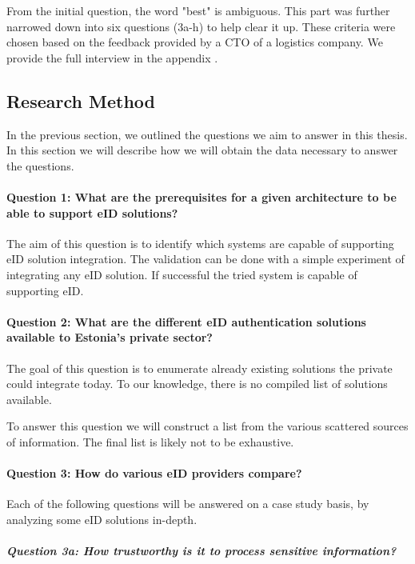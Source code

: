 From the initial question, the word "best" is ambiguous. This part was further narrowed down into six questions (3a-h) to help clear it up. These criteria were chosen based on the feedback provided by a CTO of a logistics company. We provide the full interview in the appendix .

\subsection{Research Method}

In the previous section, we outlined the questions we aim to answer in this thesis. In this section we will describe how we will obtain the data necessary to answer the questions.

\paragraph{Question 1: What are the prerequisites for a given architecture to be able to support eID solutions?}\noindent

The aim of this question is to identify which systems are capable of supporting eID solution integration. The validation can be done with a simple experiment of integrating any eID solution. If successful the tried system is capable of supporting eID.

\paragraph{Question 2: What are the different eID authentication solutions available to Estonia's private sector?}\noindent

The goal of this question is to enumerate already existing solutions the private could integrate today. To our knowledge, there is no compiled list of solutions available.

To answer this question we will construct a list from the various scattered sources of information. The final list is likely not to be exhaustive.

\paragraph{Question 3: How do various eID providers compare?}\noindent

Each of the following questions will be answered on a case study basis, by analyzing some eID solutions in-depth.

\subparagraph{Question 3a: How trustworthy is it to process sensitive information?}\noindent

